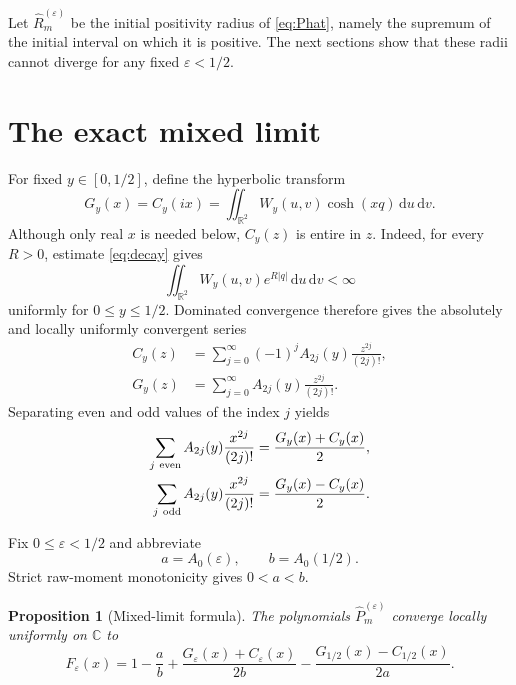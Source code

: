 \documentclass[11pt]{amsart}
\newtheorem{proposition}[theorem]{Proposition}
\theoremstyle{remark}
\newcommand{\R}{\mathbb{R}}
\newcommand{\C}{\mathbb{C}}
\newcommand{\dd}{\,\mathrm{d}}
\begin{document}
Let $\widehat R_m^{(\varepsilon)}$ be the initial positivity radius of
\eqref{eq:Phat}, namely the supremum of the initial interval on which it is
positive.  The next sections show that these radii cannot diverge for any
fixed $\varepsilon<1/2$.

\section{The exact mixed limit}

For fixed $y\in[0,1/2]$, define the hyperbolic transform
\begin{equation}\label{eq:G}
G_y(x)=C_y(ix)=\iint_{\R^2}W_y(u,v)\cosh(xq)\dd u\dd v.
\end{equation}
Although only real $x$ is needed below, $C_y(z)$ is entire in $z$.  Indeed,
for every $R>0$, estimate \eqref{eq:decay} gives
\[
\iint_{\R^2}W_y(u,v)e^{R|q|}\dd u\dd v<\infty
\]
uniformly for $0\leq y\leq1/2$.  Dominated convergence therefore gives the
absolutely and locally uniformly convergent series
\begin{align}
C_y(z)&=\sum_{j=0}^{\infty}(-1)^j
 A_{2j}(y)\frac{z^{2j}}{(2j)!},\label{eq:C-series}\\
G_y(z)&=\sum_{j=0}^{\infty}
 A_{2j}(y)\frac{z^{2j}}{(2j)!}.\label{eq:G-series}
\end{align}
Separating even and odd values of the index $j$ yields
\begin{align}
\sum_{j\ {\rm even}}A_{2j}(y)\frac{x^{2j}}{(2j)!}
 &=\frac{G_y(x)+C_y(x)}2,\label{eq:even-split}\\
\sum_{j\ {\rm odd}}A_{2j}(y)\frac{x^{2j}}{(2j)!}
 &=\frac{G_y(x)-C_y(x)}2.\label{eq:odd-split}
\end{align}

Fix $0\leq\varepsilon<1/2$ and abbreviate
\begin{equation}\label{eq:ab}
a=A_0(\varepsilon),\qquad b=A_0(1/2).
\end{equation}
Strict raw-moment monotonicity gives $0<a<b$.

\begin{proposition}[Mixed-limit formula]\label{prop:mixed-limit}
The polynomials $\widehat P_m^{(\varepsilon)}$ converge locally uniformly on
$\C$ to
\begin{equation}\label{eq:mixed-limit}
F_\varepsilon(x)=1-\frac ab
+\frac{G_\varepsilon(x)+C_\varepsilon(x)}{2b}
-\frac{G_{1/2}(x)-C_{1/2}(x)}{2a}.
\end{equation}
\end{proposition}
\end{document}
